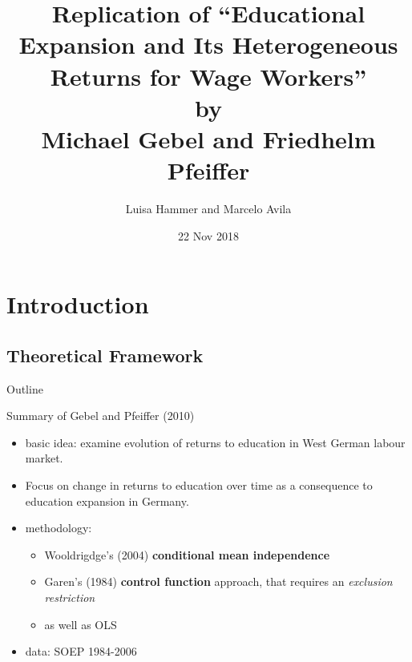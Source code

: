 \documentclass[10pt,ignorenonframetext,]{beamer}
\title{Replication of ``Educational Expansion and Its Heterogeneous Returns for
Wage Workers''\\
by\\
Michael Gebel and Friedhelm Pfeiffer}
\author{Luisa Hammer and Marcelo Avila}
\date{22 Nov 2018}
\providecommand{\tightlist}{%
  \setlength{\itemsep}{0pt}\setlength{\parskip}{0pt}}
\begin{document}
\frame{\titlepage}

\hypertarget{introduction}{%
\section{Introduction}\label{introduction}}

\hypertarget{theoretical-framework}{%
\subsection{Theoretical Framework}\label{theoretical-framework}}

\begin{frame}{Outline}
\protect\hypertarget{outline}{}

\end{frame}

\begin{frame}{Summary of Gebel and Pfeiffer (2010)}
\protect\hypertarget{summary-of-gebel-and-pfeiffer-2010}{}

\begin{itemize}
\tightlist
\item
  basic idea: examine evolution of returns to education in West German
  labour market.
\item
  Focus on change in returns to education over time as a consequence to
  education expansion in Germany.
\item
  methodology:

  \begin{itemize}
  \tightlist
  \item
    Wooldrigdge's (2004) \textbf{conditional mean independence}
  \item
    Garen's (1984) \textbf{control function} approach, that requires an
    \emph{exclusion restriction}
  \item
    as well as OLS
  \end{itemize}
\item
  data: SOEP 1984-2006
\end{itemize}

\end{frame}
\end{document}
